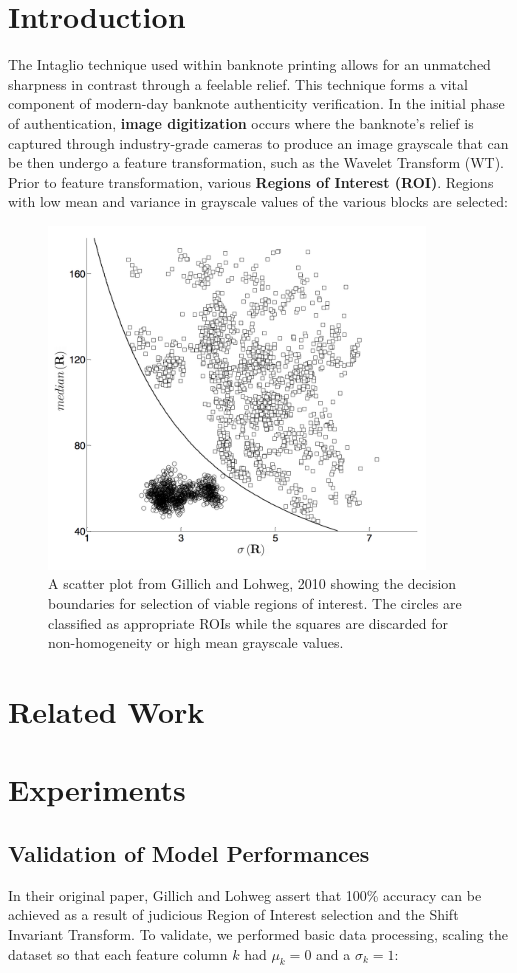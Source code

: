 \documentclass{article}
\begin{document}
\section{Introduction}
The Intaglio technique used within banknote printing allows for an unmatched sharpness in contrast through a feelable relief\cite{intaglio}. This technique forms a vital component of modern-day banknote authenticity verification. In the initial phase of authentication, \textbf{image digitization} occurs where the banknote's relief is captured through industry-grade cameras to produce an image grayscale that can be then undergo a feature transformation, such as the Wavelet Transform (WT). Prior to feature transformation, various \textbf{Regions of Interest (ROI)}. Regions with low mean and variance in grayscale values of the various blocks are selected:
\begin{figure}
  \caption{A scatter plot from Gillich and Lohweg, 2010 showing the decision boundaries for selection of viable regions of interest. The circles are classified as appropriate ROIs while the squares are discarded for non-homogeneity or high mean grayscale values.}
  \centering
\includegraphics[width=100mm]{roi_selection.png}
\end{figure}
\section{Related Work}

\section{Experiments}

\subsection{Validation of Model Performances}
In their original paper, Gillich and Lohweg assert that 100\% accuracy can be achieved as a result of judicious Region of Interest selection and the Shift Invariant Transform. To validate, we performed basic data processing, scaling the dataset so that each feature column $k$ had $\mu_{k} = 0$ and a $\sigma_{k} = 1$:
\end{document}
